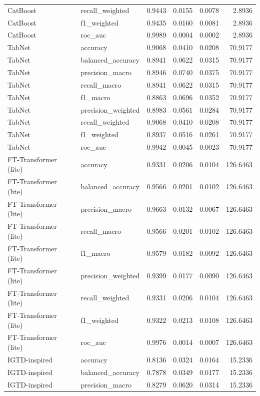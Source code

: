 \begin{tabular}{llrrrr}
CatBoost & recall_weighted & 0.9443 & 0.0155 & 0.0078 & 2.8936 \\
CatBoost & f1_weighted & 0.9435 & 0.0160 & 0.0081 & 2.8936 \\
CatBoost & roc_auc & 0.9989 & 0.0004 & 0.0002 & 2.8936 \\
TabNet & accuracy & 0.9068 & 0.0410 & 0.0208 & 70.9177 \\
TabNet & balanced_accuracy & 0.8941 & 0.0622 & 0.0315 & 70.9177 \\
TabNet & precision_macro & 0.8946 & 0.0740 & 0.0375 & 70.9177 \\
TabNet & recall_macro & 0.8941 & 0.0622 & 0.0315 & 70.9177 \\
TabNet & f1_macro & 0.8863 & 0.0696 & 0.0352 & 70.9177 \\
TabNet & precision_weighted & 0.8983 & 0.0561 & 0.0284 & 70.9177 \\
TabNet & recall_weighted & 0.9068 & 0.0410 & 0.0208 & 70.9177 \\
TabNet & f1_weighted & 0.8937 & 0.0516 & 0.0261 & 70.9177 \\
TabNet & roc_auc & 0.9942 & 0.0045 & 0.0023 & 70.9177 \\
FT-Transformer (lite) & accuracy & 0.9331 & 0.0206 & 0.0104 & 126.6463 \\
FT-Transformer (lite) & balanced_accuracy & 0.9566 & 0.0201 & 0.0102 & 126.6463 \\
FT-Transformer (lite) & precision_macro & 0.9663 & 0.0132 & 0.0067 & 126.6463 \\
FT-Transformer (lite) & recall_macro & 0.9566 & 0.0201 & 0.0102 & 126.6463 \\
FT-Transformer (lite) & f1_macro & 0.9579 & 0.0182 & 0.0092 & 126.6463 \\
FT-Transformer (lite) & precision_weighted & 0.9399 & 0.0177 & 0.0090 & 126.6463 \\
FT-Transformer (lite) & recall_weighted & 0.9331 & 0.0206 & 0.0104 & 126.6463 \\
FT-Transformer (lite) & f1_weighted & 0.9322 & 0.0213 & 0.0108 & 126.6463 \\
FT-Transformer (lite) & roc_auc & 0.9976 & 0.0014 & 0.0007 & 126.6463 \\
IGTD-inspired & accuracy & 0.8136 & 0.0324 & 0.0164 & 15.2336 \\
IGTD-inspired & balanced_accuracy & 0.7878 & 0.0349 & 0.0177 & 15.2336 \\
IGTD-inspired & precision_macro & 0.8279 & 0.0620 & 0.0314 & 15.2336 \\

\end{tabular}
